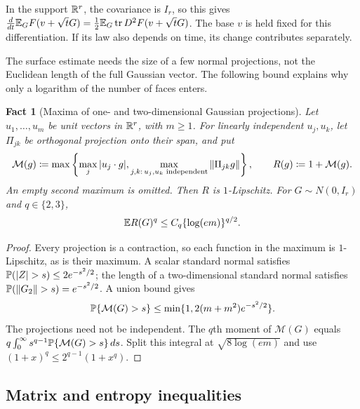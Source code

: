 \documentclass[11pt,letterpaper]{article}
\theoremstyle{plain}
\newtheorem{fact}{Fact}[section]
\begin{document}
In the support \(\mathbb R^r\), the covariance is \(I_r\), so this gives
\(\frac d{dt}\mathbb E_G F(v+\sqrt tG)=\frac12\mathbb E_G\operatorname{tr} D^2F(v+\sqrt tG)\).
The base \(v\) is held fixed for this differentiation. If its law also
depends on time, its change contributes separately.


The surface estimate needs the size of a few normal projections,
not the Euclidean length of the full Gaussian vector. The following
bound explains why only a logarithm of the number of faces enters.

\begin{fact}[Maxima of one- and two-dimensional Gaussian projections]
\label{tb:projection-moments}
Let \(u_1,\ldots,u_m\) be unit vectors in \(\mathbb R^r\), with \(m\ge1\).
For linearly independent \(u_j,u_k\), let \(\Pi_{jk}\) be orthogonal
projection onto their span, and put
\[
 \mathcal M(g)\coloneqq \max\left\{\max_j|u_j\cdot g|,
   \max_{j,k:\,u_j,u_k\text{ independent}}\left\lVert\Pi_{jk}g\right\rVert\right\},
 \qquad R(g)\coloneqq 1+\mathcal M(g).
\]
An empty second maximum is omitted. Then \(R\) is \(1\)-Lipschitz.
For \(G\sim N(0,I_r)\) and \(q\in\{2,3\}\),
\[
 \mathbb E R(G)^q\le C_q\{\log(em)\}^{q/2}.
\]
\end{fact}

\begin{proof}
Every projection is a contraction, so each function in the maximum
is \(1\)-Lipschitz, as is their maximum. A scalar standard normal
satisfies \(\Pp(|Z|>s)\le2e^{-s^2/2}\); the length of a
two-dimensional standard normal satisfies
\(\mathbb P(\left\lVert G_2\right\rVert>s)=e^{-s^2/2}\). A union bound gives
\[
 \mathbb P\{\mathcal M(G)>s\}\le\min\{1,2(m+m^2)e^{-s^2/2}\}.
\]
The projections need not be independent. The \(q\)th moment of
\(\mathcal M(G)\) equals
\(q\int_0^\infty s^{q-1}\mathbb P\{\mathcal M(G)>s\}\,ds\).
Split this integral at \(\sqrt{8\log(em)}\) and use
\((1+x)^q\le2^{q-1}(1+x^q)\).
\end{proof}


\subsection{Matrix and entropy inequalities}\label{tb:sec:matrix}
\end{document}
